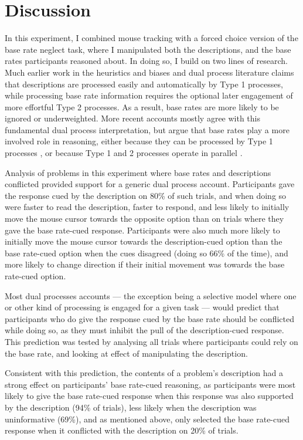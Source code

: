 
\section{Discussion}

In this experiment, I combined mouse tracking with
a forced choice version of the base rate neglect task,
where I manipulated both the descriptions,
and the base rates participants reasoned about.
In doing so, I build on two lines of research.
Much earlier work in the heuristics and biases and dual process literature 
\citep[i.e.][]{Kahneman2011,Kahneman1973}
claims that descriptions are processed easily and automatically by Type 1 processes,
while processing base rate information
requires the optional later engagement
of more effortful Type 2 processes.
As a result, base rates are more likely to be ignored or underweighted.
More recent accounts \citep[i.e.][]{DeNeys2012,Barbey2007}
mostly agree with this fundamental dual process interpretation,
but argue that base rates play a more involved role in reasoning,
either because they can be processed by Type 1 processes 
\citep{DeNeys2012}, 
or because Type 1 and 2 processes operate in parallel
\citep{Sloman1996,Barbey2007}.


Analysis of problems in this experiment where
base rates and descriptions conflicted
provided support for a generic dual process account.
Participants gave the response cued by the description
on 80\% of such trials,
and when doing so were faster to read the description,
faster to respond,
and less likely to initially move the mouse cursor
towards the opposite option than on trials
where they gave the base rate-cued response.
Participants were also much more likely to
initially move the mouse cursor towards the description-cued option
than the base rate-cued option when the cues disagreed (doing so 66\% of the time),
and more likely to change direction if their initial movement
was towards the base rate-cued option.

Most dual processes accounts ---
the exception being a selective model \citep{Klaczynski2000,Chaiken1987}
where one or other kind of processing is engaged for a given task ---
would predict that participants who do give the response cued by the base rate
should be conflicted while doing so,
as they must inhibit the pull of the description-cued response.
This prediction was tested by analysing
all trials where participants could rely on the base rate,
and looking at effect of manipulating the description.

Consistent with this prediction,
the contents of a problem's description had a strong effect
on participants' base rate-cued reasoning,
as participants were most likely to give the base rate-cued response
when this response was also supported by the description (94\% of trials),
less likely when the description was uninformative (69\%),
and as mentioned above, only selected the base rate-cued response
when it conflicted with the description on 20\% of trials.

